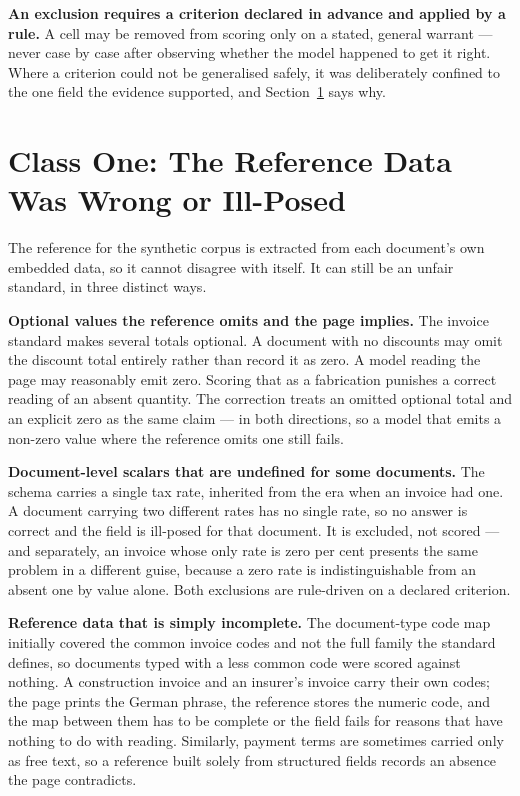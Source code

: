 \textbf{An exclusion requires a criterion declared in advance and applied by a rule.} A cell
may be removed from scoring only on a stated, general warrant --- never case by case after
observing whether the model happened to get it right. Where a criterion could not be
generalised safely, it was deliberately confined to the one field the evidence supported, and
Section~\ref{sec:validity-reference} says why.

\section{Class One: The Reference Data Was Wrong or Ill-Posed}
\label{sec:validity-reference}

The reference for the synthetic corpus is extracted from each document's own embedded data, so
it cannot disagree with itself. It can still be an unfair standard, in three distinct ways.

\textbf{Optional values the reference omits and the page implies.} The invoice standard makes
several totals optional. A document with no discounts may omit the discount total entirely
rather than record it as zero. A model reading the page may reasonably emit zero. Scoring that
as a fabrication punishes a correct reading of an absent quantity. The correction treats an
omitted optional total and an explicit zero as the same claim --- in both directions, so a
model that emits a non-zero value where the reference omits one still fails.

\textbf{Document-level scalars that are undefined for some documents.} The schema carries a
single tax rate, inherited from the era when an invoice had one. A document carrying two
different rates has no single rate, so no answer is correct and the field is ill-posed for that
document. It is excluded, not scored --- and separately, an invoice whose only rate is
zero per cent presents the same problem in a different guise, because a zero rate is
indistinguishable from an absent one by value alone. Both exclusions are rule-driven on a
declared criterion.

\textbf{Reference data that is simply incomplete.} The document-type code map initially covered
the common invoice codes and not the full family the standard defines, so documents typed with
a less common code were scored against nothing. A construction invoice and an insurer's invoice
carry their own codes; the page prints the German phrase, the reference stores the numeric code,
and the map between them has to be complete or the field fails for reasons that have nothing to
do with reading. Similarly, payment terms are sometimes carried only as free text, so a
reference built solely from structured fields records an absence the page contradicts.

